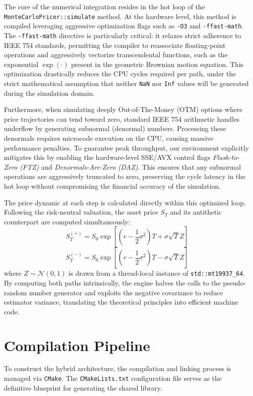 The core of the numerical integration resides in the hot loop of the \texttt{MonteCarloPricer::simulate} method. At the hardware level, this method is compiled leveraging aggressive optimization flags such as \texttt{-O3} and \texttt{-ffast-math}. The \texttt{-ffast-math} directive is particularly critical: it relaxes strict adherence to IEEE 754 standards, permitting the compiler to reassociate floating-point operations and aggressively vectorize transcendental functions, such as the exponential \(\exp(\cdot)\) present in the geometric Brownian motion equation. This optimization drastically reduces the CPU cycles required per path, under the strict mathematical assumption that neither \texttt{NaN} nor \texttt{Inf} values will be generated during the simulation domain.

Furthermore, when simulating deeply Out-of-The-Money (OTM) options where price trajectories can tend toward zero, standard IEEE 754 arithmetic handles underflow by generating subnormal (denormal) numbers. Processing these denormals requires microcode execution on the CPU, causing massive performance penalties. To guarantee peak throughput, our environment explicitly mitigates this by enabling the hardware-level SSE/AVX control flags \textit{Flush-to-Zero (FTZ)} and \textit{Denormals-Are-Zero (DAZ)}. This ensures that any subnormal operations are aggressively truncated to zero, preserving the cycle latency in the hot loop without compromising the financial accuracy of the simulation.

The price dynamic at each step is calculated directly within this optimized loop. Following the risk-neutral valuation, the asset price \(S_{T}\) and its antithetic counterpart are computed simultaneously:
\[
    S_{T}^{(+)} = S_0 \exp\left[ \left( r - \frac{1}{2}\sigma^2 \right)T + \sigma \sqrt{T} Z \right]
\]
\[
    S_{T}^{(-)} = S_0 \exp\left[ \left( r - \frac{1}{2}\sigma^2 \right)T - \sigma \sqrt{T} Z \right]
\]
where \(Z \sim \mathcal{N}(0,1)\) is drawn from a thread-local instance of \texttt{std::mt19937\_64}. By computing both paths intrinsically, the engine halves the calls to the pseudo-random number generator and exploits the negative covariance to reduce estimator variance, translating the theoretical principles into efficient machine code.

\section{Compilation Pipeline}

To construct the hybrid architecture, the compilation and linking process is managed via \texttt{CMake}. The \texttt{CMakeLists.txt} configuration file serves as the definitive blueprint for generating the shared library.

